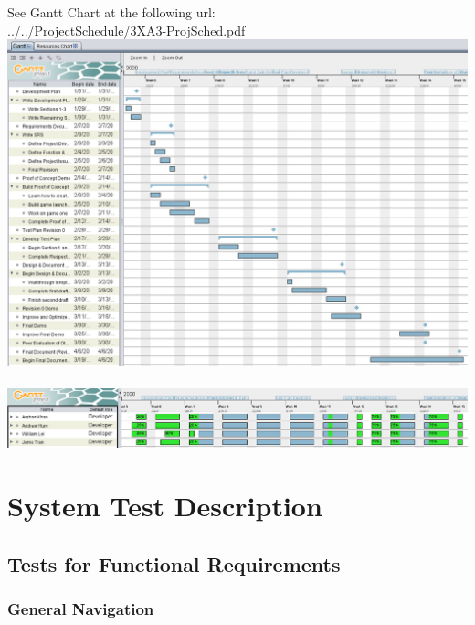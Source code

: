 \documentclass[12pt, titlepage]{article}
\begin{document}
See Gantt Chart at the following url: \\
\url{../../ProjectSchedule/3XA3-ProjSched.pdf}\\
\includegraphics[width=14cm]{TestPlan/GanttRev2.png}\\
\\
\includegraphics[width=14cm]{TestPlan/GanttRevB2.png}

\section{System Test Description}
	
\subsection{Tests for Functional Requirements}

\subsubsection{General Navigation}
\end{document}
